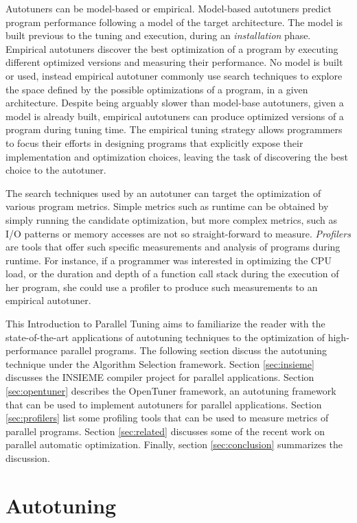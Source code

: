 \documentclass[a4paper, 12pt]{article}
\begin{document}
Autotuners can be model-based or empirical. Model-based autotuners predict
program performance following a model of the target architecture. The model
is built previous to the tuning and execution, during an \emph{installation}
phase. Empirical autotuners discover the best optimization of a program by
executing different optimized versions and measuring their performance. No
model is built or used, instead empirical autotuner commonly use search
techniques to explore the space defined by the possible optimizations
of a program, in a given architecture. Despite being arguably slower than
model-base autotuners, given a model is already built, empirical autotuners
can produce optimized versions of a program during tuning time. The empirical
tuning strategy allows programmers to focus their efforts in designing
programs that explicitly expose their implementation and optimization choices,
leaving the task of discovering the best choice to the autotuner.

The search techniques used by an autotuner can target the optimization of
various program metrics. Simple metrics such as runtime can be obtained by
simply running the candidate optimization, but more complex metrics, such
as I/O patterns or memory accesses are not so straight-forward to measure.
\emph{Profilers} are tools that offer such specific measurements and analysis
of programs during runtime. For instance, if a programmer was interested in
optimizing the CPU load, or the duration and depth of a function call stack
during the execution of her program, she could use a profiler to produce such
measurements to an empirical autotuner.

This Introduction to Parallel Tuning aims to familiarize the reader with the
state-of-the-art applications of autotuning techniques to the optimization
of high-performance parallel programs. The following section discuss the
autotuning technique under the Algorithm Selection framework. Section
\ref{sec:insieme} discusses the INSIEME compiler project for parallel
applications. Section \ref{sec:opentuner} describes the OpenTuner framework,
an autotuning framework that can be used to implement autotuners for parallel
applications. Section \ref{sec:profilers} list some profiling tools that can
be used to measure metrics of parallel programs. Section \ref{sec:related}
discusses some of the recent work on parallel automatic optimization.
Finally, section \ref{sec:conclusion} summarizes the discussion.

\section{Autotuning} \label{sec:autotuning}
\end{document}
